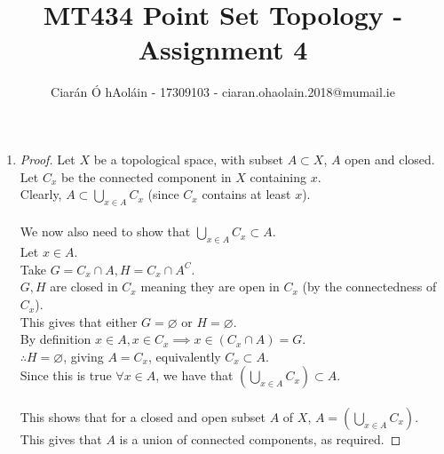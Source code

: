 \documentclass{article}
\title{MT434 Point Set Topology - Assignment 4}
\author{Ciarán Ó hAoláin - 17309103 - ciaran.ohaolain.2018@mumail.ie}
\renewcommand{\emptyset}{\varnothing}
\theoremstyle{remark}
\begin{document}
\maketitle
\begin{enumerate}
      \item \begin{proof}
                  Let $X$ be a topological space,
                  with subset $A \subset X$, $A$ open and closed.\\
                  Let $C_x$ be the connected component in $X$ containing $x$.\\
                  Clearly, $A \subset \bigcup_{x \in A} C_x$
                  (since $C_x$ contains at least $x$).\\\\
                  We now also need to show that $\bigcup_{x \in A} C_x \subset A$.\\
                  Let $x \in A$.\\
                  Take $G=C_x \cap A, H=C_x \cap A^C$. \\
                  $G, H$ are closed in $C_x$ meaning they are open in $C_x$
                  (by the connectedness of $C_x$).\\
                  This gives that either $G=\emptyset$ or $H=\emptyset$.\\
                  By definition $x \in A, x \in C_x \implies x \in (C_x \cap A) = G$.\\
                  $\therefore H = \emptyset$, giving $A = C_x$, equivalently $C_x \subset A$.\\
                  Since this is true $\forall x \in A$, we have that
                  $(\bigcup_{x \in A} C_x) \subset A$.\\\\
                  This shows that for a closed and open subset $A$ of $X$, $A=(\bigcup_{x \in A} C_x)$.\\
                  This gives that $A$ is a union of connected components, as required.
            \end{proof}


\end{enumerate}
\end{document}
